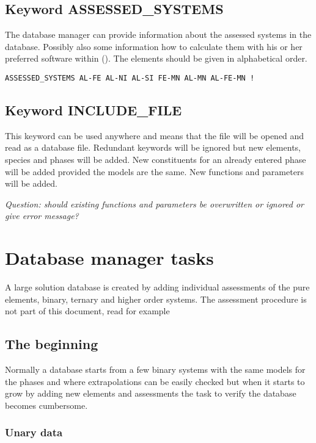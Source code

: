 \documentclass[12pt]{article}
\begin{document}
\subsection{Keyword ASSESSED\_SYSTEMS}\label{sec:assys}

The database manager can provide information about the assessed
systems in the database.  Possibly also some information how to
calculate them with his or her preferred software within ().  The
elements should be given in alphabetical order.

\begin{verbatim}
ASSESSED_SYSTEMS AL-FE AL-NI AL-SI FE-MN AL-MN AL-FE-MN !
\end{verbatim}

\subsection{Keyword INCLUDE\_FILE}

This keyword can be used anywhere and means that the file will be
opened and read as a database file.  Redundant keywords will be
ignored but new elements, species and phases will be added.  New
constituents for an already entered phase will be added provided the
models are the same.  New functions and parameters will be added.

{\em Question: should existing functions and parameters be overwritten
  or ignored or give error message?}

\section{Database manager tasks}\label{sec:manager}

A large solution database is created by adding individual assessments
of the pure elements, binary, ternary and higher order systems.
The assessment procedure is not part of this document, read for
example~\cite{07Luk}

\subsection{The beginning}

Normally a database starts from a few binary systems with the same
models for the phases and where extrapolations can be easily checked
but when it starts to grow by adding new elements and assessments the
task to verify the database becomes cumbersome.

\subsubsection{Unary data}
\end{document}
